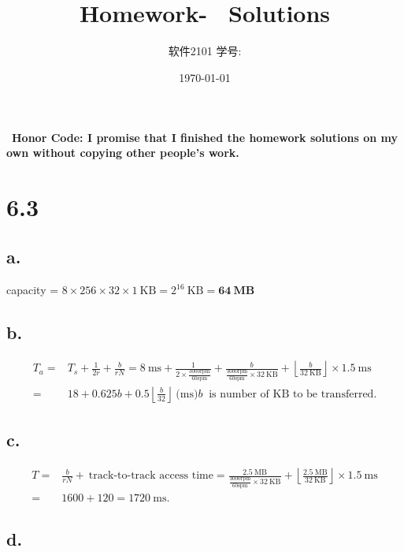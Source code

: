 \documentclass[11pt]{article}  %
\title{\vspace{-4cm}\CourseCodeName \space
        \Session \protect\\  Homework-~\textbf{\Homework} Solutions}
\author{软件2101 \Name \space 学号: \SID}
\date{\today}
\begin{document}
\maketitle

~\textbf{Honor Code: I promise that I finished the homework solutions on my own without copying other people's 
    work.}
    
\section*{6.3 }

\subsection*{a. }

capacity = $8\times 256 \times 32 \times 1~\text{KB} = 2^{16}~\text{KB} = \mathbf{64}~\textbf{MB}$

\subsection*{b.}
\vspace{-1cm}
$$
\begin{aligned}
    T_{a}=&T_{s}+\frac{1}{2 r}+\frac{b}{r N}=8 \mathrm{~ms}+\frac{1}{2\times \frac{3000 \mathrm{rpm} }{60 \mathrm{spm}}}+
\frac{b}{\frac{3000 \mathrm{rpm} }{60 \mathrm{spm}}\times32~\text{KB}}+ \left \lfloor \frac{b}{32 ~\text{KB}} \right \rfloor \times 1.5~\text{ms}\\
    =&18+0.625b+0.5\left \lfloor \frac{b}{32 } \right \rfloor ~\text{(ms)} b~\text{ is number of KB to be transferred}. 
\end{aligned}
$$

\subsection*{c.}
\vspace{-0.5cm}
$$
\begin{aligned}
    T =& \frac{b}{r N} + ~\text{track-to-track access time} 
        =\frac{2.5~\text{MB}}{\frac{3000 \mathrm{rpm} }{60 \mathrm{spm}}\times32~\text{KB}} + 
        \left \lfloor \frac{2.5~\text{MB}}{32~\text{KB}} \right \rfloor \times 1.5~\text{ms}\\
    = & 1600 + 120 = 1720~\text{ms} .
\end{aligned}
$$

\subsection*{d. }
\end{document}
